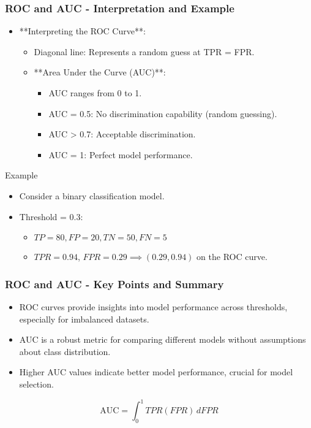 \documentclass[aspectratio=169]{beamer}
\begin{document}
\begin{frame}[fragile]
    \frametitle{ROC and AUC - Interpretation and Example}
    \begin{itemize}
        \item **Interpreting the ROC Curve**:
            \begin{itemize}
                \item Diagonal line: Represents a random guess at TPR = FPR.
                \item **Area Under the Curve (AUC)**:
                    \begin{itemize}
                        \item AUC ranges from 0 to 1.
                        \item AUC = 0.5: No discrimination capability (random guessing).
                        \item AUC > 0.7: Acceptable discrimination.
                        \item AUC = 1: Perfect model performance.
                    \end{itemize}
            \end{itemize}
    \end{itemize}
    \begin{block}{Example}
        \begin{itemize}
            \item Consider a binary classification model.
            \item Threshold = 0.3:
                \begin{itemize}
                    \item $TP = 80, FP = 20, TN = 50, FN = 5$
                    \item $TPR = 0.94$, $FPR = 0.29 \implies (0.29, 0.94)$ on the ROC curve.
                \end{itemize}
        \end{itemize}
    \end{block}
\end{frame}

\begin{frame}[fragile]
    \frametitle{ROC and AUC - Key Points and Summary}
    \begin{itemize}
        \item ROC curves provide insights into model performance across thresholds, especially for imbalanced datasets.
        \item AUC is a robust metric for comparing different models without assumptions about class distribution.
        \item Higher AUC values indicate better model performance, crucial for model selection.
    \end{itemize}
    \begin{equation}
    \text{AUC} = \int_{0}^{1} TPR(FPR) \, dFPR
    \end{equation}
\end{frame}
\end{document}
